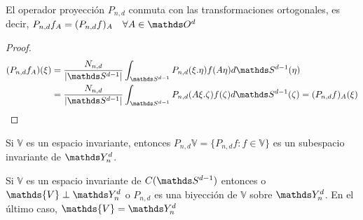 \begin{prop}El operador proyección $P_{n,d}$ conmuta con las transformaciones ortogonales, es decir, $P_{n,d}f_A=(P_{n,d}f)_A \quad \forall A\in\orto$
\end{prop}
\begin{proof}
	\begin{gather*}
	\begin{aligned}
	(P_{n,d}f_A) (\xi) &= \frac{N_{n,d}}{|\sphere|} \int_{\sphere}P_{n,d}(\xi.\eta)f(A\eta)d\sphere(\eta) \\&= \frac{N_{n,d}}{|\sphere|} \int_{\sphere}P_{n,d}(A\xi.\zeta)f(\zeta)d\sphere(\zeta) =  
	(P_{n,d}f)_A (\xi)
	\end{aligned}
	\end{gather*}
	
\end{proof}
\begin{cor}Si $\mathds{V}$ es un espacio invariante, entonces $P_{n,d}\mathds{V} = \{P_{n,d}f : f\in\mathds{V}\}$ es un subespacio invariante de $\spharm$.
\end{cor}
\begin{thm}Si $\mathds{V}$ es un espacio invariante de $C(\sphere)$ entonces o $\mathds{V} \perp \spharm$ o $P_{n,d}$ es una biyección de $\mathds{V}$ sobre $\spharm$. En el último caso, $\mathds{V}=\spharm$
\end{thm}
